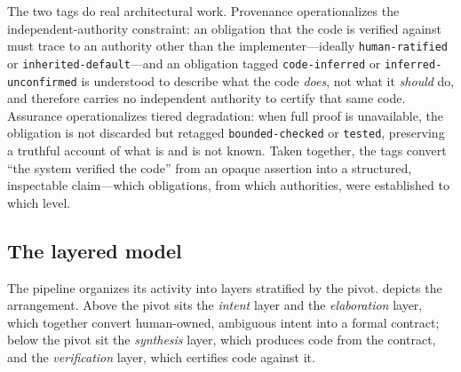 The two tags do real architectural work. Provenance operationalizes the independent-authority constraint: an obligation that the code is verified against must trace to an authority other than the implementer---ideally \texttt{human-ratified} or \texttt{inherited-default}---and an obligation tagged \texttt{code-inferred} or \texttt{inferred-unconfirmed} is understood to describe what the code \emph{does}, not what it \emph{should} do, and therefore carries no independent authority to certify that same code. Assurance operationalizes tiered degradation: when full proof is unavailable, the obligation is not discarded but retagged \texttt{bounded-checked} or \texttt{tested}, preserving a truthful account of what is and is not known. Taken together, the tags convert ``the system verified the code'' from an opaque assertion into a structured, inspectable claim---which obligations, from which authorities, were established to which level.

\subsection{The layered model}
\label{subsec:layers}

The pipeline organizes its activity into layers stratified by the pivot.  depicts the arrangement. Above the pivot sits the \emph{intent} layer and the \emph{elaboration} layer, which together convert human-owned, ambiguous intent into a formal contract; below the pivot sit the \emph{synthesis} layer, which produces code from the contract, and the \emph{verification} layer, which certifies code against it.

